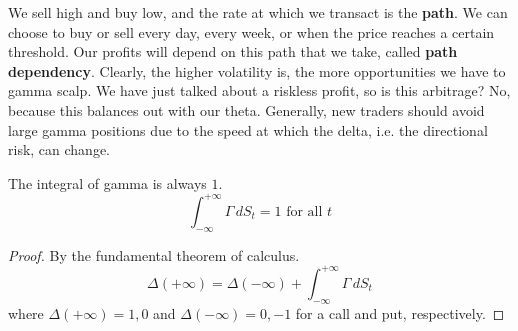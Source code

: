 \documentclass{article}
\begin{document}
    We sell high and buy low, and the rate at which we transact is the \textbf{path}. We can choose to buy or sell every day, every week, or when the price reaches a certain threshold. Our profits will depend on this path that we take, called \textbf{path dependency}. Clearly, the higher volatility is, the more opportunities we have to gamma scalp. We have just talked about a riskless profit, so is this arbitrage? No, because this balances out with our theta. Generally, new traders should avoid large gamma positions due to the speed at which the delta, i.e. the directional risk, can change. 

    \begin{lemma}
      The integral of gamma is always $1$.
      \begin{equation}
        \int_{-\infty}^{+\infty} \Gamma \,dS_t = 1 \text{ for all } t
      \end{equation}
    \end{lemma}
    \begin{proof}
      By the fundamental theorem of calculus.
      \begin{equation}
        \Delta (+\infty) = \Delta(-\infty) + \int_{-\infty}^{+\infty} \Gamma \,dS_t
      \end{equation}
      where $\Delta(+\infty) = 1, 0$ and $\Delta(-\infty) = 0, -1$ for a call and put, respectively.
    \end{proof}
\end{document}
